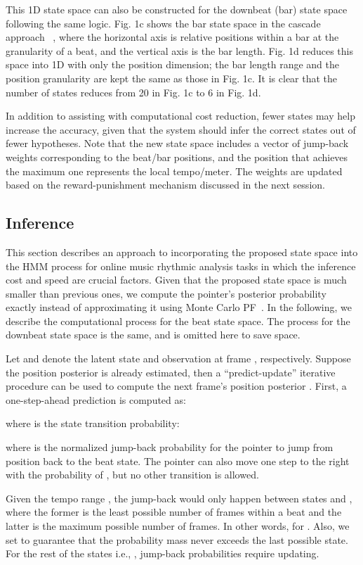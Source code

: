\documentclass{article}
\begin{document}
This 1D state space can also be constructed for the downbeat (bar) state space following the same logic. Fig. 1c shows the bar state space in the cascade approach ~\cite{Heydari:2}, where the horizontal axis is relative positions within a bar at the granularity of a beat, and the vertical axis is the bar length. Fig. 1d reduces this space into 1D with only the position dimension; the bar length range and the position granularity are kept the same as those in Fig. 1c. It is clear that the number of states reduces from 20 in Fig. 1c to 6 in Fig. 1d. 


In addition to assisting with computational cost reduction, fewer states may help increase the accuracy, given that the system should infer the correct states out of fewer hypotheses. Note that the new state space includes a vector of jump-back weights corresponding to the beat/bar positions, and the position that achieves the maximum one represents the local tempo/meter.
The weights are updated based on the reward-punishment mechanism discussed in the next session.

\subsection{Inference}
\label{ssec:Inference}
This section describes an approach to incorporating the proposed state space into the HMM process for online music rhythmic analysis tasks in which the inference cost and speed are crucial factors. Given that the proposed state space is much smaller than previous ones, we compute the pointer's posterior probability exactly instead of approximating it using Monte Carlo PF~\cite{Heydari:2}. In the following, we describe the computational process for the beat state space. The process for the downbeat state space is the same, and is omitted here to save space.


Let  and  denote the latent state and observation at frame , respectively. Suppose the position posterior  is already estimated, then a ``predict-update'' iterative procedure can be used to compute the next frame's position posterior . First, a one-step-ahead prediction is computed as: 

where  is the state transition probability:

where  is the normalized jump-back probability for the pointer to jump from position  back to the beat state. The pointer can also move one step to the right with the probability of , but no other transition is allowed.

Given the tempo range , the jump-back would only happen between states  and , where the former is the least possible number of frames within a beat and the latter is the maximum possible number of frames. In other words,  for . Also, we set  to guarantee that the probability mass never exceeds the last possible state. For the rest of the states i.e., , jump-back probabilities require updating. 
\end{document}
